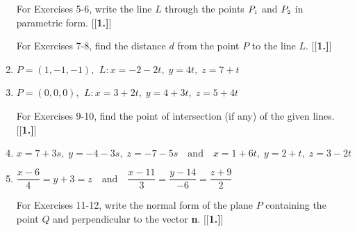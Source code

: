 \begin{enumerate}[\bfseries 1.]
\par\noindent For Exercises 5-6, write the line $L$ through the points $P_{\scriptscriptstyle 1}$ and $P_{\scriptscriptstyle 2}$ in parametric
form.
[{[\bfseries 1.]}]
\par\noindent For Exercises 7-8, find the distance $d$ from the point $P$ to the line $L$.
[{[\bfseries 1.]}]
 \item $P = (1,-1,-1)$, $~L: x = -2 - 2t, \; y = 4t, \; z = 7 + t$
 \item $P = (0,0,0)$, $~L: x = 3 + 2t, \; y = 4 + 3t, \; z = 5 + 4t$
\par\noindent For Exercises 9-10, find the point of intersection (if any) of the given lines.
[{[\bfseries 1.]}]
 \item $x = 7 + 3s, \; y = -4 - 3s, \; z = -7 - 5s \quad \text{and} \quad x = 1 + 6t, \; y = 2 + t, \; z = 3 - 2t$
 \item $\dfrac{x - 6}{4} = y + 3 = z \quad \text{and} \quad \dfrac{x - 11}{3} = \dfrac{y - 14}{-6} =
  \dfrac{z + 9}{2}$
\par\noindent For Exercises 11-12, write the normal form of the plane $P$ containing the point $Q$ and
perpendicular to the vector \textbf{n}.
[{[\bfseries 1.]}]
\end{enumerate}
